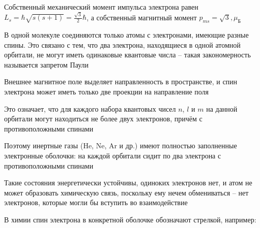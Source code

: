 \documentclass[12pt]{article}
\begin{document}
Собственный механический момент импульса электрона равен $L_s = \hbar \sqrt{s(s+1)} = \frac{\sqrt{3}}{2}\hbar$, а собственный магнитный момент $p_{m s} = \sqrt{3},\mu_{\text{Б}}$

\mediumvspace

В одной молекуле соединяются только атомы с электронами, имеющие разные спины. Это связано с тем, что два электрона, находящиеся в одной атомной орбитали, не могут иметь одинаковые квантовые числа -- такая закономерность называется запретом Паули

Внешнее магнитное поле выделяет направленность в пространстве, и спин электрона может иметь только две проекции на направление поля

Это означает, что для каждого набора квантовых чисел $n$, $l$ и $m$ на данной орбитали могут находиться не более двух электронов, причём с противоположными спинами

Поэтому инертные газы ($\mathrm{He}$, $\mathrm{Ne}$, $\mathrm{Ar}$ и др.) имеют полностью заполненные электронные оболочки: на каждой орбитали сидит по два электрона с противоположными спинами

Такие состояния энергетически устойчивы, одиноких электронов нет, и атом не может образовать химическую связь, поскольку ему нечем обмениваться -- нет электронов, которые могли бы вступить во взаимодействие

В химии спин электрона в конкретной оболочке обозначают стрелкой, например:
\end{document}
